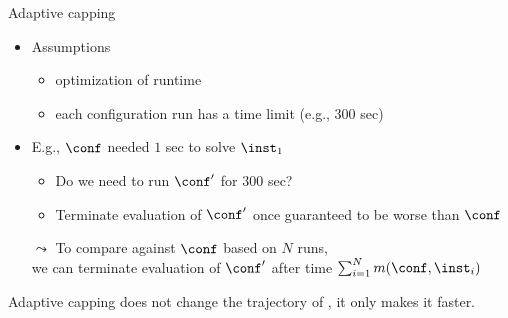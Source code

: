 \begin{frame}[c,fragile]{Adaptive capping}

\begin{itemize}
    \item Assumptions
    \begin{itemize} 
      \item optimization of runtime
      \item each configuration run has a time limit (e.g., $300$ sec)
    \end{itemize}
\pause    
    
    \item E.g., $\conf$ needed $1$ sec to solve $\inst_1$
    \begin{itemize}
      \item Do we need to run $\conf'$ for $300$ sec?
      \item Terminate evaluation of $\conf'$ once guaranteed to be worse than $\conf$
    \end{itemize}
\pause
\bigskip    
    \item[$\leadsto$] To compare against $\conf$ based on $N$ runs,\\we can terminate evaluation of $\conf'$ after time $\sum_{i=1}^N m(\conf,\inst_i)$
\end{itemize}

\pause
\begin{theorem}
Adaptive capping does not change the trajectory of \paramils{}, it only makes it faster. 
\end{theorem}

\end{frame}





